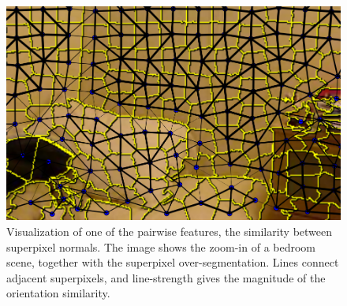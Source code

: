 \documentclass[a4paper, 10pt, conference]{ieeeconf}      %
\begin{document}
\begin{figure}
    \begin{center}
        \includegraphics[width=\linewidth]{images/normal_feature}
    \end{center}
    \caption{%
        Visualization of one of the pairwise features, the similarity between superpixel normals.
        The image shows the zoom-in of a bedroom scene, together with the superpixel over-segmentation.
        Lines connect adjacent superpixels, and line-strength gives the magnitude of the orientation similarity.
    }
\end{figure}
\end{document}
